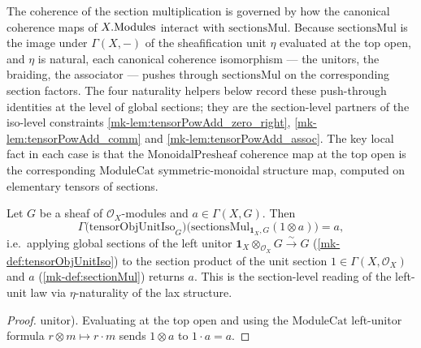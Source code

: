 The coherence of the section multiplication is governed by how the canonical
coherence maps of \(X.\mathrm{Modules}\) interact with \(\mathrm{sectionsMul}\). Because
\(\mathrm{sectionsMul}\) is the image under \(\Gamma(X,-)\) of the sheafification
unit \(\eta\) evaluated at the top open, and \(\eta\) is natural, each canonical
coherence isomorphism --- the unitors, the braiding, the associator --- pushes
through \(\mathrm{sectionsMul}\) on the corresponding section factors. The four
naturality helpers below record these push-through identities at the level of
global sections; they are the section-level partners of the iso-level constraints
\ref{mk-lem:tensorPowAdd_zero_right}, \ref{mk-lem:tensorPowAdd_comm} and
\ref{mk-lem:tensorPowAdd_assoc}. The key local fact in each case is that the
\(\mathrm{MonoidalPresheaf}\) coherence map at the top open is the corresponding
\(\mathrm{ModuleCat}\) symmetric-monoidal structure map, computed on elementary
tensors of sections.

\begin{lemma}\label{mk-lem:tensorObjUnitIso_hom_sectionsMul}
  \leanok

  Let \(G\) be a sheaf of \(\mathcal{O}_X\)-modules and \(a \in \Gamma(X, G)\).
  Then
  \[
    \Gamma\bigl(\mathrm{tensorObjUnitIso}_G\bigr)
      \bigl(\mathrm{sectionsMul}_{\mathbf{1}_X, G}(1 \otimes a)\bigr) = a,
  \]
  i.e.\ applying global sections of the left unitor
  \(\mathbf{1}_X \otimes_{\mathcal{O}_X} G \xrightarrow{\sim} G\)
  (\ref{mk-def:tensorObjUnitIso}) to the section product of the unit section
  \(1 \in \Gamma(X,\mathcal{O}_X)\) and \(a\) (\ref{mk-def:sectionMul}) returns
  \(a\). This is the section-level reading of the left-unit law via
  \(\eta\)-naturality of the lax structure.
\end{lemma}

\begin{proof}
  \leanok
  unitor). Evaluating at the top open and using the \(\mathrm{ModuleCat}\)
  left-unitor formula \(r \otimes m \mapsto r \cdot m\) sends \(1 \otimes a\) to
  \(1 \cdot a = a\).
\end{proof}

